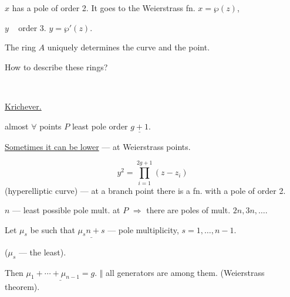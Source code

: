 \(x\) has a pole of order 2. It goes to the Weierstrass fn. \(x=\wp(z)\),

\(y\) \textemdash\,\textquotedbl\,\textemdash\ order 3. \(y=\wp'(z)\).

The ring \(A\) uniquely determines the curve and the point.

How to describe these rings?

\begin{center}\textemdash\,\textperiodcentered\,\textemdash\end{center}

\underline{Krichever.}

almost \(\forall\) points \(P\) least pole order \(\underline{g+1}\).

\underline{Sometimes it can be lower} --- at Weierstrass points.

\[
y^2=\prod_{i=1}^{2g+1}(z-z_i)
\]
(hyperelliptic curve) --- at a branch point there is a fn. with a pole of order 2.

\(n\) --- least possible pole mult. at \(P\) \(\Rightarrow\) there are poles of mult. \(2n,3n,\ldots\).

Let \(\mu_s\) be such that \(\underline{\mu_s n+s}\) ---
pole multiplicity, \(s=1,\ldots,n-1\).

(\(\mu_s\) --- the least).

Then \(\underline{\mu_1+\cdots+\mu_{n-1}=g}\).
\quad \(\Vert\) all generators are among them. (Weierstrass theorem).


